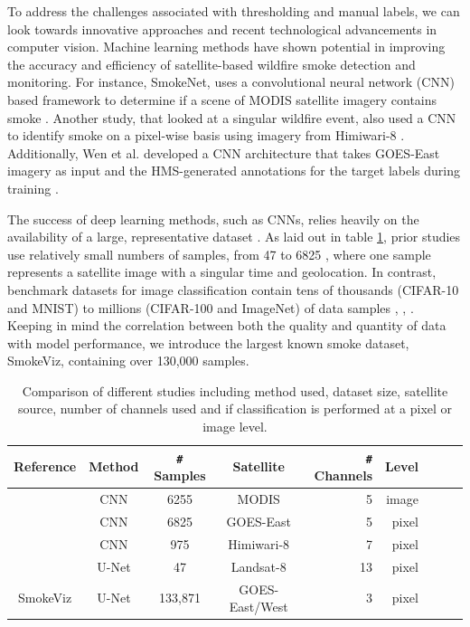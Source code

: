 \documentclass{article}
\begin{document}
To address the challenges associated with thresholding and manual labels, we can look towards innovative approaches and recent technological advancements in computer vision. Machine learning methods have shown potential in improving the accuracy and efficiency of satellite-based wildfire smoke detection and monitoring. For instance, SmokeNet, uses a convolutional neural network (CNN) based framework to determine if a scene of MODIS satellite imagery contains smoke \cite{smokenet}. Another study, that looked at a singular wildfire event, also used a CNN to identify smoke on a pixel-wise basis using imagery from Himiwari-8 \cite{larsen}. Additionally, Wen et al. developed a CNN architecture that takes GOES-East imagery as input and the HMS-generated annotations for the target labels during training \cite{smoke_goes}. 

The success of deep learning methods, such as CNNs, relies heavily on the availability of a large, representative dataset \cite{data_size}. As laid out in table \ref{studies}, prior studies use relatively small numbers of samples, from 47 \cite{wang} to 6825 \cite{smoke_goes}, where one sample represents a satellite image with a singular time and geolocation. In contrast, benchmark datasets for image classification contain tens of thousands (CIFAR-10 and MNIST) to millions (CIFAR-100 and ImageNet) of data samples \cite{cifar}, \cite{mnist}, \cite{imgnet}. Keeping in mind the correlation between both the quality and quantity of data with model performance, we introduce the largest known smoke dataset, SmokeViz, containing over 130,000 samples.

\begin{table}[h]
    \caption{Comparison of different studies including method used, dataset size, satellite source, number of channels used and if classification is performed at a pixel or image level.}\label{studies}
    \centering
    \begin{tabular}{ccccrrcrc}
        \toprule
        Reference & Method & \verb|#| Samples & Satellite & \verb|#| Channels & Level\\
        \midrule
        \cite{smokenet}& CNN & 6255 & MODIS & 5 & image\\
        \cite{smoke_goes}& CNN & 6825 & GOES-East & 5 & pixel\\
        \cite{larsen} & CNN & 975 & Himiwari-8 & 7 & pixel\\
        \cite{wang}& U-Net & 47 & Landsat-8 & 13 & pixel\\
        SmokeViz  & U-Net & 133,871 & GOES-East/West & 3 & pixel\\
        \bottomrule
    \end{tabular}
\end{table}
\end{document}
